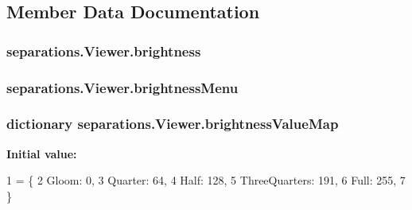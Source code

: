 \subsection{Member Data Documentation}
\hypertarget{classseparations_1_1Viewer_a272e713f0e032562ea8b1a5039e6abac}{}
\subsubsection[{brightness}]{\setlength{\rightskip}{0pt plus 5cm}separations.\+Viewer.\+brightness}\label{classseparations_1_1Viewer_a272e713f0e032562ea8b1a5039e6abac}
\hypertarget{classseparations_1_1Viewer_a1ee4cf2a496921b3813badea1227d7bf}{}
\subsubsection[{brightness\+Menu}]{\setlength{\rightskip}{0pt plus 5cm}separations.\+Viewer.\+brightness\+Menu}\label{classseparations_1_1Viewer_a1ee4cf2a496921b3813badea1227d7bf}
\hypertarget{classseparations_1_1Viewer_aa9e1be540278c7a50688928722aafe08}{}
\subsubsection[{brightness\+Value\+Map}]{\setlength{\rightskip}{0pt plus 5cm}dictionary separations.\+Viewer.\+brightness\+Value\+Map\hspace{0.3cm}{\ttfamily [static]}}\label{classseparations_1_1Viewer_aa9e1be540278c7a50688928722aafe08}
{\bfseries Initial value\+:}
\begin{DoxyCode}
1 = \{
2         Gloom: 0,
3         Quarter: 64,
4         Half: 128,
5         ThreeQuarters: 191,
6         Full: 255,
7     \}
\end{DoxyCode}
\hypertarget{classseparations_1_1Viewer_a5687005d61cf38c2ebbda1ae01ee2063}{}
